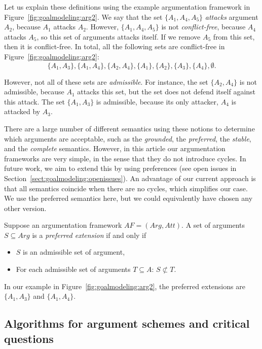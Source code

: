 Let us explain these definitions using the example argumentation framework in Figure~\ref{fig:goalmodeling:arg2}. We say that the set $\{A_1,A_4,A_5\}$ \emph{attacks} argument $A_2$, because $A_1$ attacks $A_2$. However, $\{A_1,A_4,A_5\}$ is not \emph{conflict-free}, because $A_4$ attacks $A_5$, so this set of arguments attacks itself. If we remove $A_5$ from this set, then it is conflict-free. In total, all the following sets are conflict-free in Figure~\ref{fig:goalmodeling:arg2}: $$\{A_1,A_3\},\{A_1,A_4\},\{A_2,A_4\},\{A_1\},\{A_2\},\{A_3\},\{A_4\},\emptyset.$$

However, not all of these sets are \emph{admissible}. For instance, the set $\{A_2,A_4\}$ is not admissible, because $A_1$ attacks this set, but the set does not defend itself against this attack. The set $\{A_1,A_3\}$ is admissible, because its only attacker, $A_4$ is attacked by $A_3$. 

There are a large number of different semantics using these notions to determine which arguments are acceptable, such as the \emph{grounded}, the \emph{preferred}, the \emph{stable}, and the \emph{complete} semantics. However, in this article our argumentation frameworks are very simple, in the sense that they do not introduce cycles. In future work, we aim to extend this by using preferences (see open issues in Section~\ref{sect:goalmodeling:openissues}). An advantage of our current approach is that all semantics coincide when there are no cycles, which simplifies our case. We use the preferred semantics here, but we could equivalently have chosen any other version.

\begin{definition} 
Suppose an argumentation framework $AF=(Arg,Att)$. A set of arguments $S\subseteq Arg$ is a \emph{preferred extension} if and only if 
\begin{itemize}
\item $S$ is an admissible set of argument,
\item For each admissible set of arguments $T\subseteq A$: $S\not\subset T$.
\end{itemize}
\end{definition}

In our example in Figure~\ref{fig:goalmodeling:arg2}, the preferred extensions are $\{A_1,A_3\}$ and $\{A_1,A_4\}$.

\subsection{Algorithms for argument schemes and critical questions}

